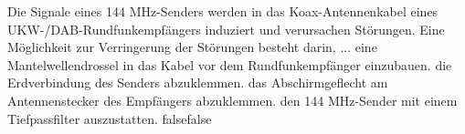     {Die Signale eines 144 MHz-Senders werden in das Koax-Antennenkabel eines UKW-/DAB-Rundfunkempfängers induziert und verursachen Störungen. Eine Möglichkeit zur Verringerung der Störungen besteht darin, ...}
    {eine Mantelwellendrossel in das Kabel vor dem Rundfunkempfänger einzubauen.}
    {die Erdverbindung des Senders abzuklemmen.}
    {das Abschirmgeflecht am Antennenstecker des Empfängers abzuklemmen.}
    {den 144 MHz-Sender mit einem Tiefpassfilter auszustatten.}
    {false}{false}